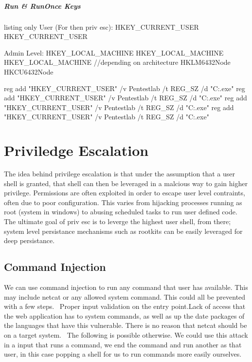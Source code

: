 \subparagraph{Run & RunOnce Keys}
 
\begin{tcblisting}{listing only}
User (For then priv esc):
HKEY_CURRENT_USER\Software\Microsoft\Windows\CurrentVersion\Run
HKEY_CURRENT_USER\Software\Microsoft\Windows\CurrentVersion\RunOnce

Admin Level:
HKEY_LOCAL_MACHINE\SOFTWARE\Microsoft\Windows\CurrentVersion\Run
HKEY_LOCAL_MACHINE\SOFTWARE\Microsoft\Windows\CurrentVersion\RunOnce
HKEY_LOCAL_MACHINE\Software\Microsoft\Windows\CurrentVersion\Policies\Explorer\Run
//depending on architecture
HKLM\Software\Wow6432Node\Microsoft\Windows\CurrentVersion\Run
HKCU\Software\Wow6432Node\Microsoft\Windows\CurrentVersion\RunOnce

reg add "HKEY_CURRENT_USER\Software\Microsoft\Windows\CurrentVersion\Run" /v Pentestlab /t REG_SZ /d "C:\Users\pentestlab\pentestlab.exe"
reg add "HKEY_CURRENT_USER\Software\Microsoft\Windows\CurrentVersion\RunOnce" /v Pentestlab /t REG_SZ /d "C:\Users\pentestlab\pentestlab.exe"
reg add "HKEY_CURRENT_USER\Software\Microsoft\Windows\CurrentVersion\RunServices" /v Pentestlab /t REG_SZ /d "C:\Users\pentestlab\pentestlab.exe"
reg add "HKEY_CURRENT_USER\Software\Microsoft\Windows\CurrentVersion\RunServicesOnce" /v Pentestlab /t REG_SZ /d "C:\Users\pentestlab\pentestlab.exe"

\end{tcblisting}

\section{Priviledge Escalation}
The idea behind privilege escalation is that under the assumption that a user shell is granted, that shell can then be leveraged in a malcious way to gain higher privilege.
Permissions are often exploited in order to escape user level contraints, often due to poor configuration. This varies from hijacking processes running as root (system in windows) to
abusing scheduled tasks to run user defined code. The ultimate goal of priv esc is to leverge the highest user shell, from there; system level persistance mechanisms such as rootkits can be easily
leveraged for deep persistance. 

\subsection{Command Injection}
We can use command injection to run any command that user has available. This may include netcat or any allowed system command. This could all be prevented with a few steps. 
Proper input validation on the entry point.Lack of access that the web application has to system commands, as well as up the date packages of the languages that have this vulnerable. There is no reason that netcat should be on a target system. 
The following is possible otherwise. We could use this attack in a input that runs a command, we end the command and run another as that user, in this case popping a shell for us to run commands more easily ourselves.

